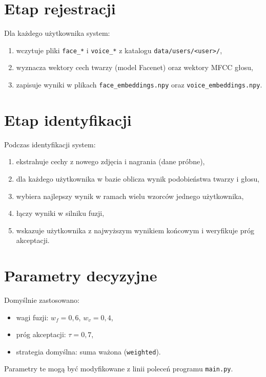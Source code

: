 \section{Etap rejestracji}

Dla każdego użytkownika system:
\begin{enumerate}
    \item wczytuje pliki \texttt{face\_*} i \texttt{voice\_*} z katalogu \texttt{data/users/<user>/},
    \item wyznacza wektory cech twarzy (model Facenet) oraz wektory MFCC głosu,
    \item zapisuje wyniki w plikach \texttt{face\_embeddings.npy} oraz \texttt{voice\_embeddings.npy}.
\end{enumerate}

\section{Etap identyfikacji}

Podczas identyfikacji system:
\begin{enumerate}
    \item ekstrahuje cechy z nowego zdjęcia i nagrania (dane próbne),
    \item dla każdego użytkownika w bazie oblicza wynik podobieństwa twarzy i głosu,
    \item wybiera najlepszy wynik w ramach wielu wzorców jednego użytkownika,
    \item łączy wyniki w silniku fuzji,
    \item wskazuje użytkownika z najwyższym wynikiem końcowym i weryfikuje próg akceptacji.
\end{enumerate}

\section{Parametry decyzyjne}

Domyślnie zastosowano:
\begin{itemize}
    \item wagi fuzji: $w_f = 0{,}6$, $w_v = 0{,}4$,
    \item próg akceptacji: $\tau = 0{,}7$,
    \item strategia domyślna: suma ważona (\texttt{weighted}).
\end{itemize}

Parametry te mogą być modyfikowane z linii poleceń programu \texttt{main.py}.
